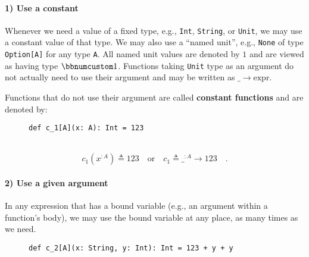 \paragraph{1) Use a constant}

Whenever we need a value of a fixed type, e.g., \lstinline!Int!,
\lstinline!String!, or \lstinline!Unit!, we may use a constant value
of that type. We may also use a \textsf{``}named unit\textsf{''},
e.g., \lstinline!None! of type \lstinline!Option[A]! for any type
\lstinline!A!. All named unit values are denoted by $1$ and are
viewed as having type $\bbnum 1$. Functions taking \lstinline!Unit!
type as an argument do not actually need to use their argument and
may be written as $\_\rightarrow\text{expr}$.

Functions that do not use their argument are called \textbf{constant
functions} and are denoted by:

\begin{wrapfigure}{l}{0.5\columnwidth}%
\vspace{-0.65\baselineskip}
\begin{lstlisting}
def c_1[A](x: A): Int = 123
\end{lstlisting}

\vspace{-0.35\baselineskip}
\end{wrapfigure}%

~\vspace{-1.25\baselineskip}
\[
c_{1}(x^{:A})\triangleq123\quad\text{or}\quad c_{1}\triangleq\_^{:A}\rightarrow123\quad.
\]
\vspace{-1.25\baselineskip}


\paragraph{2) Use a given argument}

In any expression that has a bound variable
(e.g., an argument within a function\textsf{'}s body), we may use the bound
variable at any place, as many times as we need.

\begin{wrapfigure}{l}{0.5\columnwidth}%
\vspace{-0.65\baselineskip}
\begin{lstlisting}
def c_2[A](x: String, y: Int): Int = 123 + y + y
\end{lstlisting}

\vspace{-0.25\baselineskip}
\end{wrapfigure}%

